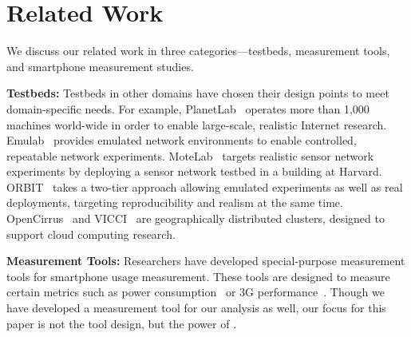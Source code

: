 \section{Related Work}
\label{sec:related}
We discuss our related work in three categories---testbeds, measurement tools,
and smartphone measurement studies.

{\bf Testbeds:} Testbeds in other domains have chosen their design points
to meet domain-specific needs. For example, PlanetLab~\cite{peterson:ccr:2003,
planetlab} operates more than 1,000 machines world-wide in order to enable
large-scale, realistic Internet research. Emulab~\cite{white:osdi:2002, emulab}
provides emulated network environments to enable controlled, repeatable network
experiments. MoteLab~\cite{werner-allen:ipsn:2005} targets realistic sensor
network experiments by deploying a sensor network testbed in a building at
Harvard. ORBIT~\cite{raychaudhuri:tridentcom:2005} takes a two-tier approach
allowing emulated experiments as well as real deployments, targeting
reproducibility and realism at the same time.
OpenCirrus~\cite{avetisyan:computer:2010, opencirrus} and VICCI~\cite{vicci} are
geographically distributed clusters, designed to support cloud computing
research.

{\bf Measurement Tools:} Researchers have developed special-purpose
measurement tools for smartphone usage measurement. These tools are designed to
measure certain metrics such as power consumption~\cite{zhang:codes:2010,
pathak:eurosys:2012} or 3G performance~\cite{huang:mobisys:2010}. Though we have
developed a measurement tool for our analysis as well, our focus for this paper
is not the tool design, but the power of \PhoneLab{}.

